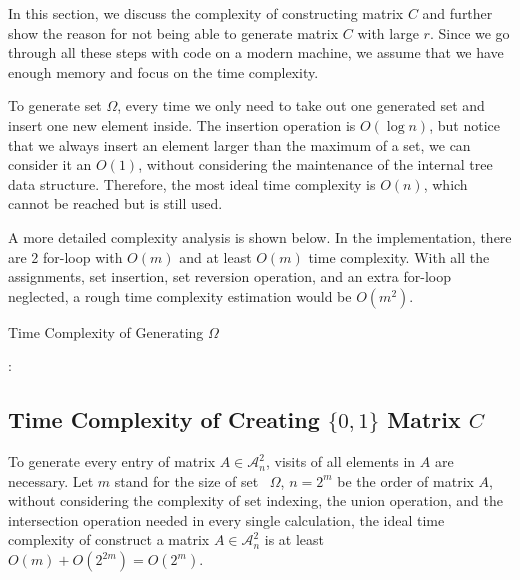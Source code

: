 \documentclass[11pt]{article}
\begin{document}
In this section, we discuss the complexity of constructing matrix $C$ and further show the reason for not being able to generate matrix $C$ with large $r$. Since we go through all these steps with code on a modern machine, we assume that we have enough memory and focus on the time complexity.

To generate set $\Omega$, every time we only need to take out one generated set and insert one new element inside. The insertion operation is $O(\log n)$, but notice that we always insert an element larger than the maximum of a set, we can consider it an $O(1)$, without considering the maintenance of the internal tree data structure. Therefore, the most ideal time complexity is $O(n)$, which cannot be reached but is still used.

A more detailed complexity analysis is shown below. In the implementation, there are 2 for-loop with $O(m)$ and at least $O(m)$ time complexity. With all the assignments, set insertion, set reversion operation, and an extra for-loop neglected, a rough time complexity estimation would be $O(m^2)$.

\begin{algorithm}[H] 
    \caption{Time Complexity of Generating $\Omega$}
    \label{alg:loop_tc}
    \begin{algorithmic}[1]
    \Ensure{$\Omega$}
         
                      
             
                 
                :
                     
                \EndIf
                 
                     
                \EndFor
            \EndFor
        \EndFor
        \State \Return {$\Omega$}
    \end{algorithmic}
\end{algorithm}

\subsection{Time Complexity of Creating $\{0, 1\}$ Matrix $C$}
To generate every entry of matrix $A \in \mathcal{A}_n^2$, visits of all elements in $A$ are necessary. Let $m$ stand for the size of set  $\Omega$, $n=2^m$ be the order of matrix $A$, without considering the complexity of set indexing, the union operation, and the intersection operation needed in every single calculation, the ideal time complexity of construct a matrix $A \in \mathcal{A}_n^2$ is at least $O(m) + O(2^{2m}) = O(2^m)$.
\end{document}
